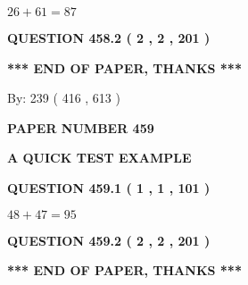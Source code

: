 \documentclass[12pt]{article}
\begin{document}
  
 
 

$ %
26 +  %
61=   %
87$
 
 
  
\vspace{0.2in}
  
{\textbf{\Large{QUESTION
458.2 
 ( 2 , 2 , 201 )
}}}
  
  
   
   
 \vspace{0.2in}
 
   
   
   
   
\vspace{1.0in} 
{\textbf{\large{ *** END OF PAPER, THANKS *** }}} 
   
   
\hspace{1.0in} By: 
 239 ( 416 ,  613 )
   
   
   
   
\newpage 
\setcounter{page}{ 
   459001 } 
   
   
   
   
 {\textbf{ \Large{ PAPER NUMBER  459  }}}
   
   
\vspace{0.2in}
   
   
   
   
   
   
 \vspace{0.2in}
{\LARGE {\textbf{ A QUICK TEST EXAMPLE}}}
   
   
  
\vspace{0.2in}
  
{\textbf{\Large{QUESTION
459.1 
 ( 1 , 1 , 101 )
}}}
  
  
 
 

$ %
48 +  %
47=   %
95$
 
 
  
\vspace{0.2in}
  
{\textbf{\Large{QUESTION
459.2 
 ( 2 , 2 , 201 )
}}}
  
  
   
   
 \vspace{0.2in}
 
   
   
   
   
\vspace{1.0in} 
{\textbf{\large{ *** END OF PAPER, THANKS *** }}} 
   
\end{document}
